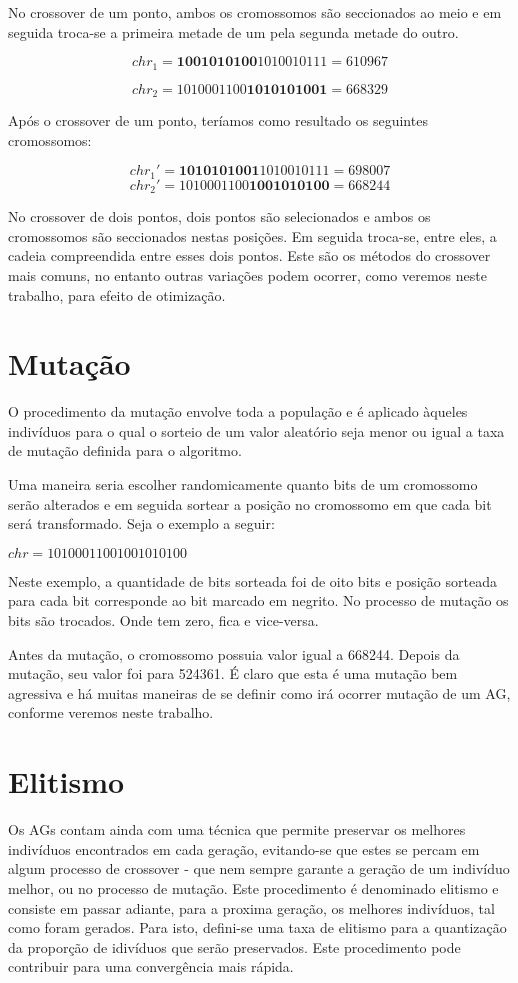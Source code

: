 \documentclass[
    12pt,               %
    twoside,            %
    a4paper,            %
    english,            %
    french,             %
    spanish,            %
    brazil,             %
    ]{abntex2}
\begin{document}
  No crossover de um ponto, ambos os cromossomos são seccionados ao meio e em seguida troca-se a primeira metade de um pela segunda metade do outro. 

  $$chr_1 = \textbf{1001010100}1010010111 = 610967$$
  
  $$chr_2 = 1010001100\textbf{1010101001} = 668329$$

  Após o crossover de um ponto, teríamos como resultado os seguintes cromossomos:

  $$chr_1' = \textbf{1010101001}1010010111 = 698007$$
  $$chr_2' = 1010001100\textbf{1001010100} = 668244$$

  No crossover de dois pontos, dois pontos são selecionados e ambos os cromossomos são seccionados nestas posições. Em seguida troca-se, entre eles, a cadeia compreendida entre esses dois pontos. Este são os métodos do crossover mais comuns, no entanto outras variações podem ocorrer, como veremos neste trabalho, para efeito de otimização.

\section{Mutação}

  O procedimento da mutação envolve toda a população  e é aplicado àqueles indivíduos para o qual o sorteio de um valor aleatório seja menor ou igual a taxa de mutação definida para o algoritmo.

  Uma maneira seria escolher randomicamente quanto bits de um cromossomo serão alterados e em seguida sortear a posição no cromossomo em que cada bit será transformado. Seja o exemplo a seguir:

  $chr = 10100011001001010100$

  Neste exemplo, a quantidade de bits sorteada foi de oito bits e posição sorteada para cada bit corresponde ao bit marcado em negrito. No processo de mutação os bits são trocados. Onde tem zero, fica e vice-versa.

  Antes da mutação, o cromossomo possuia valor igual a 668244. Depois da mutação, seu valor foi para 524361. É claro que esta é uma mutação bem agressiva e há muitas maneiras de se definir como irá ocorrer mutação de um AG, conforme veremos neste trabalho.

\section{Elitismo}

  Os AGs contam ainda com uma técnica que permite preservar os melhores indivíduos encontrados em cada geração, evitando-se que estes se percam em algum processo de crossover - que nem sempre garante a geração de um indivíduo melhor, ou no processo de mutação. Este procedimento é denominado elitismo e consiste em passar adiante, para a proxima geração, os melhores indivíduos, tal como foram gerados. Para isto, defini-se uma taxa de elitismo para a quantização da proporção de idivíduos que serão preservados. Este procedimento pode contribuir para uma convergência mais rápida.
\end{document}
